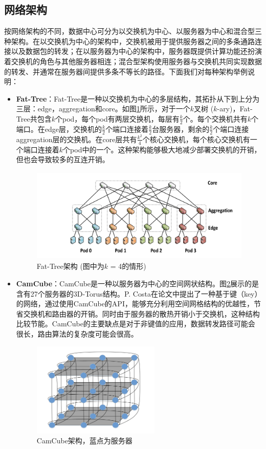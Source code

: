 \subsection{网络架构}
按网络架构的不同，数据中心可分为以交换机为中心、以服务器为中心和混合型三种架构。在以交换机为中心的架构中，交换机被用于提供服务器之间的多条通路连接以及数据包的转发；在以服务器为中心的架构中，服务器既提供计算功能还扮演着交换机的角色与其他服务器相连；混合型架构使用服务器与交换机共同实现数据的转发、并通常在服务器间提供多条不等长的路径。下面我们对每种架构举例说明：
\begin{itemize}
    \item \textbf{Fat-Tree}：Fat-Tree是一种以交换机为中心的多层结构，其拓扑从下到上分为三层：edge，aggregation和core。如图\ref{fig:fat-tree}所示，对于一个$k$叉树 ($k$-ary)，Fat-Tree共包含$k$个pod，每个pod有两层交换机，每层有$\frac{k}{2}$个。每个交换机共有$k$个端口。在edge层，交换机的$\frac{k}{2}$个端口连接着$\frac{k}{2}$台服务器，剩余的$\frac{k}{2}$个端口连接aggregation层的交换机。在core层共有$\frac{k^2}{4}$个核心交换机，每个核心交换机有一个端口连接着$k$个pod中的一个。这种架构能够极大地减少部署交换机的开销，但也会导致较多的互连开销。
    \begin{figure}[h]
    \centering
    \includegraphics[height=4.5cm]{figure/fat-tree.png}
    \caption{Fat-Tree架构 (图中为$k$ = 4的情形) \cite{alfares2008fattree}}
    \label{fig:fat-tree}
    \end{figure}
    
    \item \textbf{CamCube}：CamCube是一种以服务器为中心的空间网状结构。图\ref{fig:camcube}展示的是含有27个服务器的3D-Torus结构。P. Costa在论文中提出了一种基于键（key）的网络，通过使用CamCube的API，能够充分利用空间网格结构的优越性，节省交换机和路由器的开销。同时由于服务器的散热开销小于交换机，这种结构比较节能。CamCube的主要缺点是对于非键值的应用，数据转发路径可能会很长，路由算法的复杂度可能会很高\cite{wang2014rethinking}。
    \begin{figure}[h]
    \centering
    \includegraphics[height=4.5cm]{figure/camcube.png}
    \caption{CamCube架构，蓝点为服务器 \cite{costa2012camcube}}
    \label{fig:camcube}
    \end{figure}
    

\end{itemize}
